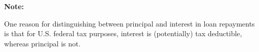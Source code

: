 \documentclass[12pt]{article}
\begin{document}

\begin{flushleft}
    \textbf{Note:} \\
\end{flushleft}

\begin{flushleft}
    One reason for distinguishing between principal and interest in loan repayments is that for U.S.
    federal tax purposes, interest is (potentially) tax deductible, whereas principal is not.
\end{flushleft}
\end{document}
